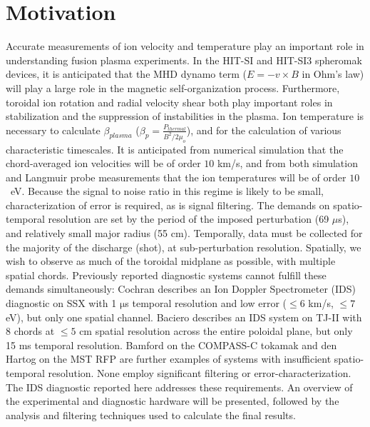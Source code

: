 \section{Motivation}
\hspace{4ex}Accurate measurements of ion velocity and temperature play an important role in understanding fusion plasma experiments. In the HIT-SI and HIT-SI3 spheromak devices, it is anticipated that the MHD dynamo term ($E=-v\times{B}$ in Ohm's law) will play a large role in the magnetic self-organization process\cite{akcay2013extended}. Furthermore, toroidal ion rotation and radial velocity shear both play important roles in stabilization and the suppression of instabilities in the plasma. Ion temperature is necessary to calculate $\beta_{plasma}$ ($\beta_p = \frac{P_{thermal}}{B^2/2\mu_o}$), and for the calculation of various characteristic timescales. It is anticipated from numerical simulation\cite{akcay2013extended} that the chord-averaged ion velocities will be of order $10$ km/s, and from both simulation and Langmuir probe measurements that the ion temperatures will be of order $10$~eV. Because the signal to noise ratio in this regime is likely to be small, characterization of error is required, as is signal filtering. The demands on spatio-temporal resolution are set by the period of the imposed perturbation (69 $\mu$s), and relatively small major radius (55 cm). Temporally, data must be collected for the majority of the discharge (shot), at sub-perturbation resolution. Spatially, we wish to observe as much of the toroidal midplane as possible, with multiple spatial chords. Previously reported diagnostic systems cannot fulfill these demands simultaneously: Cochran \cite{cothran2006fast} describes an Ion Doppler Spectrometer (IDS) diagnostic on SSX with 1 $\mathrm{\mu}$s temporal resolution and low error ($\leq6$ km/s, $\leq7$ eV), but only one spatial channel. Baciero \cite{Baciero2001JT-II} describes an IDS system on TJ-II with 8 chords at $\leq5$ cm spatial resolution across the entire poloidal plane, but only 15 ms temporal resolution. Bamford \cite{bamford1992combination} on the COMPASS-C tokamak and den Hartog \cite{den1994fast} on the MST RFP are further examples of systems with insufficient spatio-temporal resolution. None employ significant filtering or error-characterization. The IDS diagnostic reported here addresses these requirements. An overview of the experimental and diagnostic hardware will be presented, followed by the analysis and filtering techniques used to calculate the final results.



